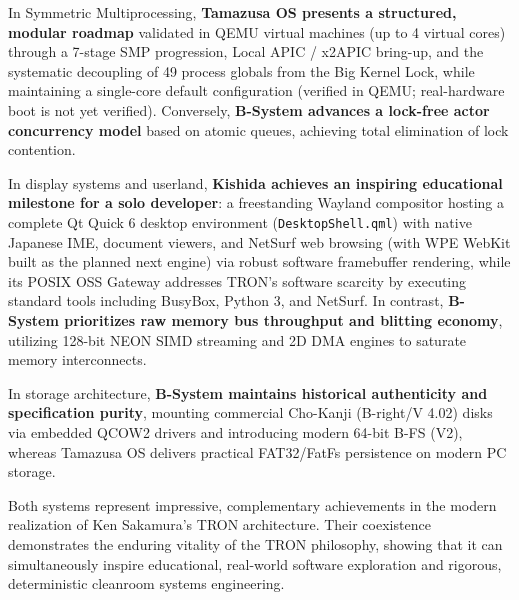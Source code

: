\documentclass[10pt,journal,compsoc,twocolumn]{article}
\begin{document}
In Symmetric Multiprocessing, \textbf{Tamazusa OS presents a structured, modular roadmap} validated in QEMU virtual machines (up to 4 virtual cores) through a 7-stage SMP progression, Local APIC / x2APIC bring-up, and the systematic decoupling of 49 process globals from the Big Kernel Lock, while maintaining a single-core default configuration (verified in QEMU; real-hardware boot is not yet verified). Conversely, \textbf{B-System advances a lock-free actor concurrency model} based on atomic queues, achieving total elimination of lock contention.

In display systems and userland, \textbf{Kishida achieves an inspiring educational milestone for a solo developer}: a freestanding Wayland compositor hosting a complete Qt Quick 6 desktop environment (\texttt{DesktopShell.qml}) with native Japanese IME, document viewers, and NetSurf web browsing (with WPE WebKit built as the planned next engine) via robust software framebuffer rendering, while its POSIX OSS Gateway addresses TRON's software scarcity by executing standard tools including BusyBox, Python 3, and NetSurf. In contrast, \textbf{B-System prioritizes raw memory bus throughput and blitting economy}, utilizing 128-bit NEON SIMD streaming and 2D DMA engines to saturate memory interconnects.

In storage architecture, \textbf{B-System maintains historical authenticity and specification purity}, mounting commercial Cho-Kanji (B-right/V 4.02) disks via embedded QCOW2 drivers and introducing modern 64-bit B-FS (V2), whereas Tamazusa OS delivers practical FAT32/FatFs persistence on modern PC storage.

Both systems represent impressive, complementary achievements in the modern realization of Ken Sakamura's TRON architecture. Their coexistence demonstrates the enduring vitality of the TRON philosophy, showing that it can simultaneously inspire educational, real-world software exploration and rigorous, deterministic cleanroom systems engineering.
\end{document}
